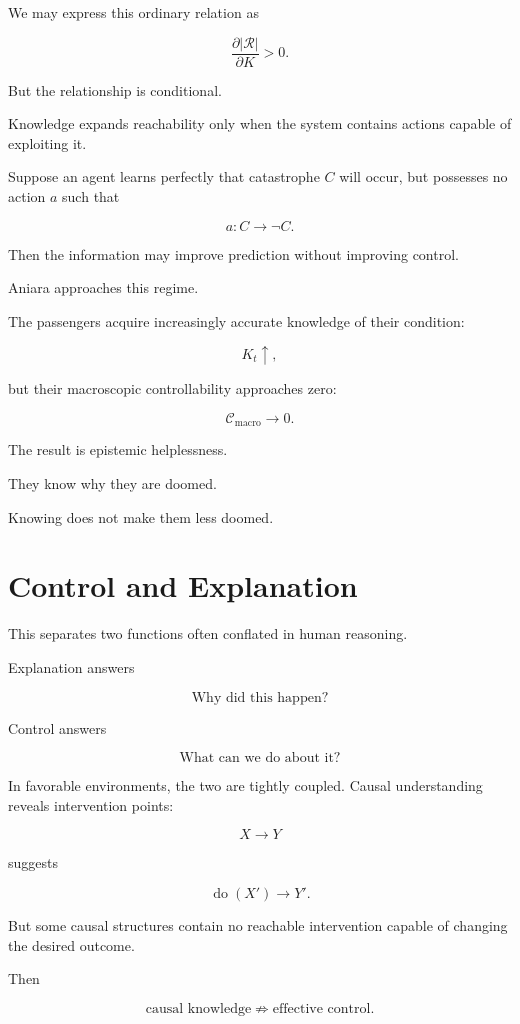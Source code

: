 \documentclass[11pt,oneside]{book}
\theoremstyle{definition}
\theoremstyle{remark}
\newcommand{\R}{\mathcal{R}}
\begin{document}
We may express this ordinary relation as

\[
\frac{\partial |\R|}
{\partial K}>0.
\]

But the relationship is conditional.

Knowledge expands reachability only when the system contains actions capable of exploiting it.

Suppose an agent learns perfectly that catastrophe \(C\) will occur, but possesses no action \(a\) such that

\[
a:C\rightarrow\neg C.
\]

Then the information may improve prediction without improving control.

Aniara approaches this regime.

The passengers acquire increasingly accurate knowledge of their condition:

\[
K_t\uparrow,
\]

but their macroscopic controllability approaches zero:

\[
\mathcal C_{\mathrm{macro}}\rightarrow0.
\]

The result is epistemic helplessness.

They know why they are doomed.

Knowing does not make them less doomed.

\section{Control and Explanation}

This separates two functions often conflated in human reasoning.

Explanation answers

\[
\text{Why did this happen?}
\]

Control answers

\[
\text{What can we do about it?}
\]

In favorable environments, the two are tightly coupled. Causal understanding reveals intervention points:

\[
X\rightarrow Y
\]

suggests

\[
\operatorname{do}(X')\rightarrow Y'.
\]

But some causal structures contain no reachable intervention capable of changing the desired outcome.

Then

\[
\text{causal knowledge}
\not\Rightarrow
\text{effective control}.
\]
\end{document}
